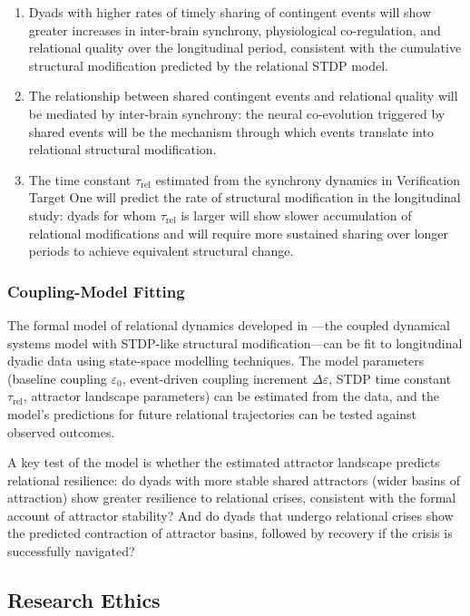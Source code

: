 \begin{enumerate}
\item Dyads with higher rates of timely sharing of contingent events will show greater increases in inter-brain synchrony, physiological co-regulation, and relational quality over the longitudinal period, consistent with the cumulative structural modification predicted by the relational STDP model.
\item The relationship between shared contingent events and relational quality will be mediated by inter-brain synchrony: the neural co-evolution triggered by shared events will be the mechanism through which events translate into relational structural modification.
\item The time constant $\tau_{\mathrm{rel}}$ estimated from the synchrony dynamics in Verification Target One will predict the rate of structural modification in the longitudinal study: dyads for whom $\tau_{\mathrm{rel}}$ is larger will show slower accumulation of relational modifications and will require more sustained sharing over longer periods to achieve equivalent structural change.
\end{enumerate}

\subsubsection{Coupling-Model Fitting}
\label{p14:subsubsec:modelfitting}

\noindent
The formal model of relational dynamics developed in ---the coupled dynamical systems model with STDP-like structural modification---can be fit to longitudinal dyadic data using state-space modelling techniques. The model parameters (baseline coupling $\varepsilon_0$, event-driven coupling increment $\Delta\varepsilon$, STDP time constant $\tau_{\mathrm{rel}}$, attractor landscape parameters) can be estimated from the data, and the model's predictions for future relational trajectories can be tested against observed outcomes.

A key test of the model is whether the estimated attractor landscape predicts relational resilience: do dyads with more stable shared attractors (wider basins of attraction) show greater resilience to relational crises, consistent with the formal account of attractor stability? And do dyads that undergo relational crises show the predicted contraction of attractor basins, followed by recovery if the crisis is successfully navigated?

\subsection{Research Ethics}
\label{p14:subsec:ethics}

